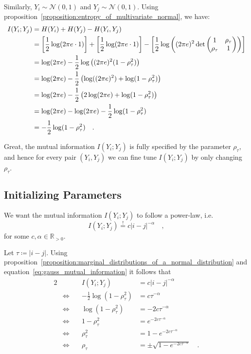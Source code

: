 \documentclass[../../main.tex]{subfiles}
\begin{document}
Similarly, $Y_i \sim \mathcal{N}(0, 1)$ and $Y_j \sim \mathcal{N}(0, 1)$. Using proposition~\ref{proposition:entropy_of_multivariate_normal}, we have:
\begin{align}
    I(Y_i; Y_j) &= H(Y_i) + H(Y_j) - H(Y_i, Y_j) \notag \\
    &= \left[ \frac{1}{2} \log(2\pi e \cdot 1) \right] + \left[ \frac{1}{2} \log(2\pi e \cdot 1) \right] - \left[ \frac{1}{2} \log\left( (2\pi e)^2 \det\begin{pmatrix*} 1 & \rho_\tau \\ \rho_\tau & 1 \end{pmatrix*} \right) \right] \notag \\
    &= \log(2\pi e) - \frac{1}{2} \log\left( (2\pi e)^2 (1-\rho_\tau^2) \right) \notag \\
    &= \log(2\pi e) - \frac{1}{2} \left( \log((2\pi e)^2) + \log(1-\rho_\tau^2) \right) \notag \\
    &= \log(2\pi e) - \frac{1}{2} \left( 2\log(2\pi e) + \log(1-\rho_\tau^2) \right) \notag \\
    &= \log(2\pi e) - \log(2\pi e) - \frac{1}{2}\log(1-\rho_\tau^2) \notag \\
    &= -\frac{1}{2}\log(1-\rho_\tau^2) \label{eq:gauss_mutual_information} \quad .
\end{align}

Great, the mutual information $I(Y_i; Y_j)$ is fully specified by the parameter $\rho_\tau$, and hence for every pair $(Y_i, Y_j)$ we can fine tune $I(Y_i; Y_j)$ by only changing $\rho_\tau$.

\subsection{Initializing Parameters}
We want the mutual information $I(Y_i; Y_j)$ to follow a power-law, i.e.
\[
    I(Y_i; Y_j) \overset{!}{=} c |i-j|^{-\alpha} \quad ,
\]
for some $c, \alpha \in \mathbb{R}_{>0}$.

Let $\tau \coloneqq |i-j|$. Using proposition~\ref{proposition:marginal_distributions_of_a_normal_distribution}  and equation~\eqref{eq:gauss_mutual_information} it follows that
\begin{alignat*}{2}
    && I(Y_i; Y_j) &= c |i-j|^{-\alpha} \\
    & \iff \quad & -\frac{1}{2}\log(1-\rho_\tau^2) &= c \tau^{-\alpha} \\
    & \iff \quad & \log(1-\rho_\tau^2) &= -2c \tau^{-\alpha} \\
    & \iff \quad & 1-\rho_\tau^2 &= e^{-2c \tau^{-\alpha}} \\
    & \iff \quad & \rho_\tau^2 &= 1 - e^{-2c \tau^{-\alpha}} \\
    & \iff \quad & \rho_\tau &= \pm \sqrt{1 - e^{-2c \tau^{-\alpha}}} \quad . \\
\end{alignat*}
\end{document}
